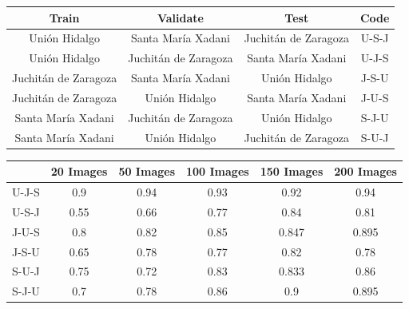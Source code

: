 \begin{center}
  \begin{tabular}{|c|c|c|c|}
    \hline
    Train                  &Validate               &Test                   &Code  \\ \hline
    Uni\'on Hidalgo        &Santa Mar\'ia Xadani   &Juchit\'an de Zaragoza &U-S-J \\ \hline
    Uni\'on Hidalgo        &Juchit\'an de Zaragoza &Santa Mar\'ia Xadani   &U-J-S \\ \hline
    Juchit\'an de Zaragoza &Santa Mar\'ia Xadani   &Uni\'on Hidalgo        &J-S-U \\ \hline
    Juchit\'an de Zaragoza &Uni\'on Hidalgo        &Santa Mar\'ia Xadani   &J-U-S \\ \hline
    Santa Mar\'ia Xadani   &Juchit\'an de Zaragoza &Uni\'on Hidalgo        &S-J-U \\ \hline
    Santa Mar\'ia Xadani   &Uni\'on Hidalgo        &Juchit\'an de Zaragoza &S-U-J \\ 
    \hline
  \end{tabular}
\end{center}


\begin{center}
  \begin{tabular}{|c|c|c|c|c|c|}
    \hline
         &20 Images &50 Images &100 Images&150 Images&200 Images\\ \hline
    U-J-S&0.9       &0.94      &0.93      &0.92      &0.94      \\ \hline
    U-S-J&0.55      &0.66      &0.77      &0.84      &0.81      \\ \hline
    J-U-S&0.8       &0.82      &0.85      &0.847     &0.895     \\ \hline
    J-S-U&0.65      &0.78      &0.77      &0.82      &0.78      \\ \hline
    S-U-J&0.75      &0.72      &0.83      &0.833     &0.86      \\ \hline
    S-J-U&0.7       &0.78      &0.86      &0.9       &0.895     \\ 
    \hline
  \end{tabular}
\end{center}



